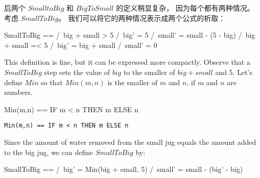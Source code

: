 \begin{ch}
  后两个\tlasubaction{} $SmalltoBig$ 和 $BigToSmall$ 的定义稍显复杂，
  因为每个都有两种情况。
  考虑 $SmallToBig$。
  我们可以将它的两种情况表示成两个公式的析取：
  \begin{display}
  \begin{notla}
  SmallToBig == \/ /\ big + small > 5
		   /\ big' = 5
		   /\ small' = small - (5 - big)
		\/ /\ big + small =< 5
		   /\ big' = big + small
		   /\ small' = 0
  \end{notla}
  \begin{tlatex}
  \end{tlatex}
  \end{display}
\end{ch}
\begin{en}
This definition is fine, but it can be expressed more compactly.
Observe that a $SmallToBig$ step sets the value of $big$ to the
smaller of $big+small$ and 5.  Let's define $Min$ so that $Min(m, n)$
is the smaller of $m$ and $n$, if $m$ and $n$ are numbers.
\begin{twocols}
\begin{notla}
Min(m,n) == IF m < n THEN m ELSE n
\end{notla}
\begin{tlatex}
%
\end{tlatex}
\midcol
\verb|Min(m,n) == IF m < n THEN m ELSE n|
\end{twocols}
Since the amount of water removed from the small jug equals the amount
added to the big jug, we can define $SmallToBig$ by:
\begin{display}
\begin{notla}
SmallToBig == /\ big' = Min(big + small, 5)
              /\ small' = small - (big' - big)
\end{notla}
\begin{tlatex}
\end{tlatex}
\end{display}
\end{en}
